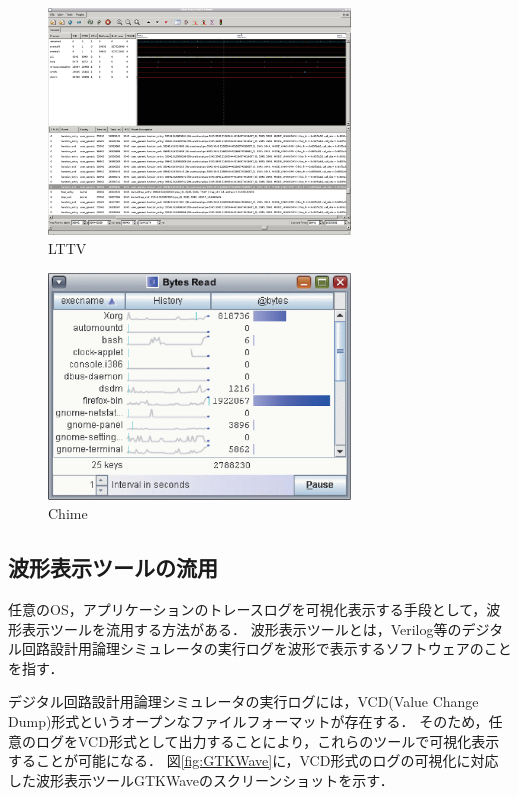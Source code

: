 \begin{figure}
\begin{center}
\includegraphics[height=6cm]{LTTV.eps}
\caption{LTTV}
\label{fig:LTTV}
\end{center}
\end{figure}

\begin{figure}
\begin{center}
\includegraphics[height=6cm]{Chime.eps}
\caption{Chime}
\label{fig:Chime}
\end{center}
\end{figure}

\subsection*{波形表示ツールの流用}
任意のOS，アプリケーションのトレースログを可視化表示する手段として，波形表示ツールを流用する方法がある．
波形表示ツールとは，Verilog等のデジタル回路設計用論理シミュレータの実行ログを波形で表示するソフトウェアのことを指す．

デジタル回路設計用論理シミュレータの実行ログには，VCD(Value Change Dump)形式というオープンなファイルフォーマットが存在する．
そのため，任意のログをVCD形式として出力することにより，これらのツールで可視化表示することが可能になる．
図\ref{fig:GTKWave}に，VCD形式のログの可視化に対応した波形表示ツールGTKWaveのスクリーンショットを示す．

